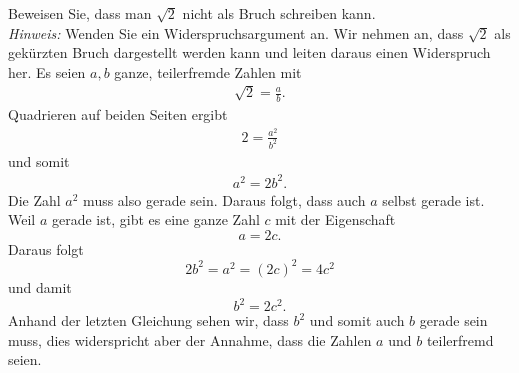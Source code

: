 \begin{example}
    Beweisen Sie, dass man $\sqrt{2}$ nicht als Bruch schreiben kann.\\
    \textit{Hinweis:} Wenden Sie ein Widerspruchsargument an.
    \tcblower
    Wir nehmen an, dass $\sqrt{2}$ als gekürzten Bruch dargestellt werden kann und leiten daraus einen Widerspruch her. Es seien $a,b$ ganze, teilerfremde Zahlen mit
    \begin{align*}
        \sqrt{2}=\frac{a}{b}.
    \end{align*}
    Quadrieren auf beiden Seiten ergibt
    \begin{align*}
        2=\frac{a^2}{b^2}
    \end{align*}
    und somit
    \begin{align*}
        a^2=2b^2.
    \end{align*}
    Die Zahl $a^2$ muss also gerade sein. Daraus folgt, dass auch $a$ selbst gerade ist. Weil $a$ gerade ist, gibt es eine ganze Zahl $c$ mit der Eigenschaft
    $$
        a=2c.
    $$
    Daraus folgt
    $$
        2b^2=a^2=(2c)^2=4c^2
    $$
    und damit
    $$
        b^2=2c^2.
    $$
    Anhand der letzten Gleichung sehen wir, dass $b^2$ und somit auch $b$ gerade sein muss, dies widerspricht aber der Annahme, dass die Zahlen $a$ und $b$ teilerfremd seien.
\end{example}
